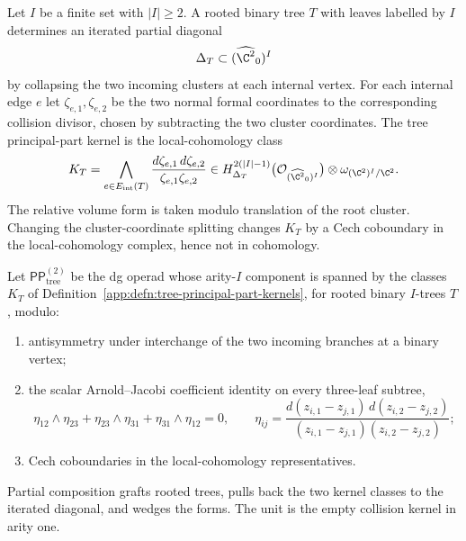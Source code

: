 \begin{defn}
\label{app:defn:tree-principal-part-kernels}
Let \(I\) be a finite set with \(|I|\geq2\).  A rooted binary tree
\(T\) with leaves labelled by \(I\) determines an iterated partial
diagonal
\[
  \Delta_T\subset(\widehat{\C^2}_0)^I
\]
by collapsing the two incoming clusters at each internal vertex.  For
each internal edge \(e\) let
\(\zeta_{e,1},\zeta_{e,2}\) be the two normal formal coordinates to the
corresponding collision divisor, chosen by subtracting the two cluster
coordinates.  The tree principal-part kernel is the local-cohomology
class
\[
  K_T
  =
  \bigwedge_{e\in E_{\mathrm{int}}(T)}
  \frac{d\zeta_{e,1}\,d\zeta_{e,2}}
       {\zeta_{e,1}\zeta_{e,2}}
  \in
  H^{2(|I|-1)}_{\Delta_T}
  \bigl(\mathcal O_{(\widehat{\C^2}_0)^I}\bigr)
  \otimes \omega_{(\C^2)^{I}/\C^2}.
\]
The relative volume form is taken modulo translation of the root
cluster.  Changing the cluster-coordinate splitting changes \(K_T\) by
a Cech coboundary in the local-cohomology complex, hence not in
cohomology.
\end{defn}

\begin{defn}[Formal \(d=2\) tree-kernel current operad]
\label{app:defn:tree-kernel-current-operad}
Let \(\mathsf{PP}^{(2)}_{\mathrm{tree}}\) be the dg operad whose
arity-\(I\) component is spanned by the classes \(K_T\) of
Definition~\ref{app:defn:tree-principal-part-kernels}, for rooted
binary \(I\)-trees \(T\), modulo:
\begin{enumerate}[label=\textup{(\roman*)}]
  \item antisymmetry under interchange of the two incoming branches at
        a binary vertex;
  \item the scalar Arnold--Jacobi coefficient identity on every
        three-leaf subtree,
        \[
          \eta_{12}\wedge\eta_{23}
          +\eta_{23}\wedge\eta_{31}
          +\eta_{31}\wedge\eta_{12}=0,
          \qquad
          \eta_{ij}=
          \frac{d(z_{i,1}-z_{j,1})\,d(z_{i,2}-z_{j,2})}
          {(z_{i,1}-z_{j,1})(z_{i,2}-z_{j,2})};
        \]
  \item Cech coboundaries in the local-cohomology representatives.
\end{enumerate}
Partial composition grafts rooted trees, pulls back the two kernel
classes to the iterated diagonal, and wedges the forms.  The unit is
the empty collision kernel in arity one.
\end{defn}

